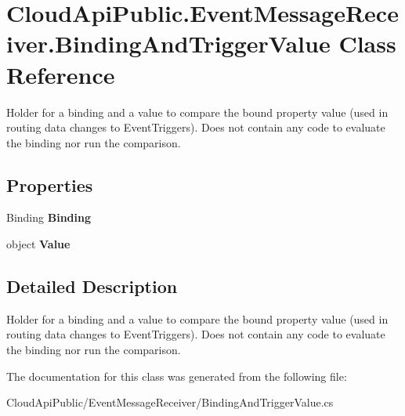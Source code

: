 \hypertarget{class_cloud_api_public_1_1_event_message_receiver_1_1_binding_and_trigger_value}{\section{Cloud\-Api\-Public.\-Event\-Message\-Receiver.\-Binding\-And\-Trigger\-Value Class Reference}
\label{class_cloud_api_public_1_1_event_message_receiver_1_1_binding_and_trigger_value}
}


Holder for a binding and a value to compare the bound property value (used in routing data changes to Event\-Triggers). Does not contain any code to evaluate the binding nor run the comparison.  


\subsection*{Properties}
\begin{DoxyCompactItemize}
\item 
\hypertarget{class_cloud_api_public_1_1_event_message_receiver_1_1_binding_and_trigger_value_aec905a965c8f564c96e186227751aac8}{Binding {\bfseries Binding}}\label{class_cloud_api_public_1_1_event_message_receiver_1_1_binding_and_trigger_value_aec905a965c8f564c96e186227751aac8}

\item 
\hypertarget{class_cloud_api_public_1_1_event_message_receiver_1_1_binding_and_trigger_value_a430b078ad30b809adbd242c3ea896177}{object {\bfseries Value}}\label{class_cloud_api_public_1_1_event_message_receiver_1_1_binding_and_trigger_value_a430b078ad30b809adbd242c3ea896177}

\end{DoxyCompactItemize}


\subsection{Detailed Description}
Holder for a binding and a value to compare the bound property value (used in routing data changes to Event\-Triggers). Does not contain any code to evaluate the binding nor run the comparison. 



The documentation for this class was generated from the following file\-:\begin{DoxyCompactItemize}
\item 
Cloud\-Api\-Public/\-Event\-Message\-Receiver/Binding\-And\-Trigger\-Value.\-cs\end{DoxyCompactItemize}
